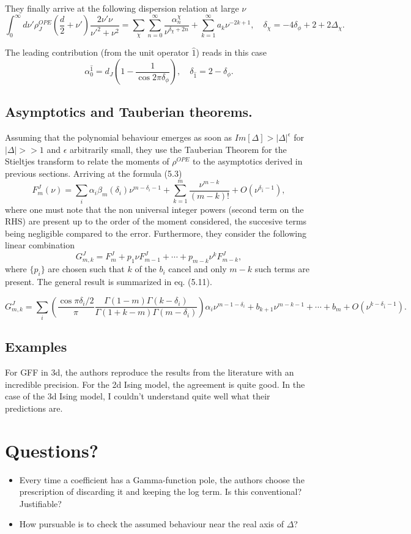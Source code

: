 \documentclass[letterpaper]{article}
\begin{document}
They finally arrive at the following dispersion relation at large $\nu$
\[
  \int_0 ^\infty d\nu' \rho_J^{OPE} \left(\frac{d}{2} + \nu'\right)
  \frac{2\nu'\nu}{\nu'^2 + \nu^2}
  =
  \sum_\chi \sum_{n=0}^\infty \frac{\alpha_n^{\chi}}{\nu^{\delta_\chi + 2n}}+
\sum_{k=1}^\infty a_k \nu^{-2k+1}, \quad
\delta_\chi = -4\delta_\phi +2+2\Delta_\chi .
\]

The leading contribution (from the unit operator $\hat 1$) reads in this case
\[
  \alpha_0^{\hat 1} = d_J\left( 1 - \frac{1}{\cos 2\pi \delta_\phi} \right),
  \quad
  \delta_{\hat 1} = 2 -\delta_\phi.
\]

\subsection{Asymptotics and Tauberian theorems.}
Assuming that the polynomial behaviour emerges as soon as $Im[\Delta] >
|\Delta|^{\epsilon}$ for $|\Delta| >>1$ and $\epsilon$ arbitrarily small, they
use the Tauberian Theorem for the Stieltjes transform to relate the moments of
$\rho^{OPE}$ to the asymptotics derived in previous sections. Arriving at the
formula (5.3)
\[
  F_m^J(\nu) = \sum_i \alpha_i \beta_m(\delta_i)\nu^{m-\delta_i-1} +
  \sum_{k=1}^m \frac{\nu^{m-k}}{(m-k)!} + O(\nu^{\delta_{\hat 1} -1}),
\]
where one must note that the non universal integer powers (second term on the
RHS) are present up to the order of the moment considered, the succesive terms
being negligible compared to the error. Furthermore, they consider the following
linear combination
\[
  G_{m,k}^J = F^J_m + p_1 \nu F^J_{m-1} + \cdots + p_{m-k} \nu^k F^J_{m-k},
\]
where $\{p_i\}$ are chosen such that $k$ of the $b_i$ cancel and only $m-k$ such terms
are present. The general result is summarized in eq. (5.11).

\[
  G_{m,k}^J = \sum_i\left(\frac{\cos \pi\delta_i/2}{\pi} \frac{\Gamma(1-m)
  \Gamma(k-\delta_i)}{\Gamma(1+k-m) \Gamma(m-\delta_i)}\right) \alpha_i
  \nu^{m-1-\delta_i} + b_{k+1} \nu^{m-k-1} +\cdots + b_m +
  O(\nu^{k-\delta_{\hat 1} -1}).
\]

\subsection{Examples}
For GFF in 3d, the authors reproduce the results from the literature with an
incredible precision. For the 2d Ising model, the agreement is quite good. In
the case of the 3d Ising model, I couldn't understand quite well what their
predictions are.

\section{Questions?}
\begin{itemize}
  \item Every time a coefficient has a Gamma-function pole, the authors choose
    the prescription of discarding it and keeping the log term. Is this
    conventional? Justifiable?
%
  \item How pursuable is to check the assumed behaviour near the real axis of
    $\Delta$?
\end{itemize}
\end{document}
